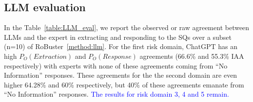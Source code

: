 \documentclass[sn-mathphys,Numbered]{sn-jnl}%
\theoremstyle{thmstyleone}%
\theoremstyle{thmstyletwo}%
\theoremstyle{thmstylethree}%
\begin{document}
%
%
%
\subsection{LLM evaluation}
%
In the Table~\ref{table:LLM_eval}, we report the observed or raw agreement between LLMs and the expert in extracting and responding to the SQs over a subset (n=10) of RoBuster~\ref{method:llm}.
For the first risk domain, ChatGPT has an high $P_{O} (Extraction)$ and $P_{O} (Response)$ agreements (66.6\% and 55.3\% IAA respectively) with experts with none of these agreements coming from ``No Information'' responses.
These agreements for the the second domain are even higher 64.28\% and 60\% respectively, but 40\% of these agreements emanate from ``No Information'' responses.
\textcolor{blue}{The results for risk domain 3, 4 and 5 remain.}
\end{document}

